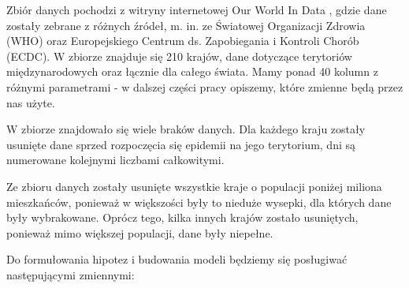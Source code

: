\documentclass[12pt]{mwbk}
\theoremstyle{plain}
\theoremstyle{definition}
\theoremstyle{remark}
\begin{document}
Zbiór danych pochodzi z witryny internetowej Our World In Data \cite{owid}, gdzie dane zostały zebrane z różnych źródeł, m. in. ze Światowej Organizacji Zdrowia (WHO) oraz Europejskiego Centrum ds. Zapobiegania i Kontroli Chorób (ECDC). W zbiorze znajduje się 210 krajów, dane dotyczące terytoriów międzynarodowych oraz łącznie dla całego świata. Mamy ponad 40 kolumn z różnymi parametrami - w dalszej części pracy opiszemy, które zmienne będą przez nas użyte.

W zbiorze znajdowało się wiele braków danych. Dla każdego kraju zostały usunięte dane sprzed rozpoczęcia się epidemii na jego terytorium, dni są numerowane kolejnymi liczbami całkowitymi.

Ze zbioru danych zostały usunięte wszystkie kraje o populacji poniżej miliona mieszkańców, ponieważ w większości były to nieduże wysepki, dla których dane były wybrakowane. Oprócz tego, kilka innych krajów zostało usuniętych, ponieważ mimo większej populacji, dane były niepełne.

Do formułowania hipotez i budowania modeli będziemy się posługiwać następującymi zmiennymi:
\end{document}
